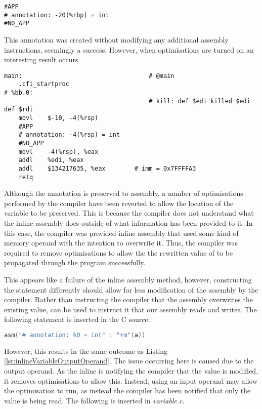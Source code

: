 \begin{lstlisting}[firstnumber=30, caption=variable-O0.s]
#APP
# annotation: -20(%rbp) = int
#NO_APP
\end{lstlisting}

This annotation was created without modifying any additional assembly instructions, seemingly a success. However, when optimisations are turned on an interesting result occurs.

\begin{lstlisting}[firstnumber=6, caption=variable-O3.s, label=lst:inlineVariableOutputOperand]
main:                                   # @main
	.cfi_startproc
# %bb.0:
                                        # kill: def $edi killed $edi def $rdi
	movl	$-10, -4(%rsp)
	#APP
	# annotation: -4(%rsp) = int
	#NO_APP
	movl	-4(%rsp), %eax
	addl	%edi, %eax
	addl	$134217635, %eax        # imm = 0x7FFFFA3
	retq
\end{lstlisting}

Although the annotation is preserved to assembly, a number of optimisations performed by the compiler have been reverted to allow the location of the variable  to be preserved. This is because the compiler does not understand what the inline assembly does outside of what information has been provided to it. In this case, the compiler was provided inline assembly that used some kind of memory operand with the intention to overwrite it. Thus, the compiler was required to remove optimisations to allow the the rewritten value of  to be propagated through the program successfully. 

This appears like a failure of the inline assembly method, however, constructing the statement differently should allow for less modification of the assembly by the compiler. Rather than instructing the compiler that the assembly overwrites the existing value,  can be used to instruct it that our assembly reads and writes. The following statement is inserted in the C source.

\begin{lstlisting}[language=C, numbers=none]
asm("# annotation: %0 = int" : "+m"(a))
\end{lstlisting}

However, this results in the same outcome as Listing \ref{lst:inlineVariableOutputOperand}. The issue occurring here is caused due to the output operand. As the inline  is notifying the compiler that the value is modified, it removes optimisations to allow this. Instead, using an input operand may allow the optimisation to run, as instead the compiler has been notified that only the value is being read. The following  is inserted in \textit{variable.c}.

